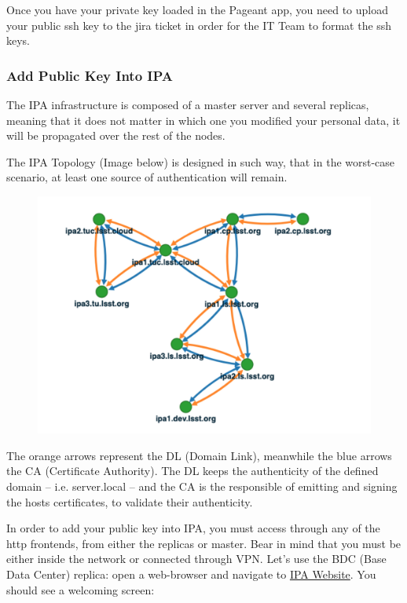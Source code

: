 Once you have your private key loaded in the Pageant app, you need to upload your public ssh key to the jira ticket in order for the IT Team to format the ssh keys.

\newpage

\subsubsection{Add Public Key Into IPA}

The IPA infrastructure is composed of a master server and several replicas, meaning that it does
not matter in which one you modified your personal data, it will be propagated over the rest of the nodes.

\vspace{5 mm}

The IPA Topology (Image below) is designed in such way, that in the worst-case scenario, at least one source
of authentication will remain.

\begin{figure}
  \includegraphics[width=13cm]{Images/example11.png}
\end{figure}

The orange arrows represent the DL (Domain Link), meanwhile the blue arrows the CA (Certificate
Authority). The DL keeps the authenticity of the defined domain – i.e. server.local – and the CA is the
responsible of emitting and signing the hosts certificates, to validate their authenticity.

\vspace{5 mm}
\newpage

In order to add your public key into IPA, you must access through any of the http frontends, from either
the replicas or master. Bear in mind that you must be either inside the network or connected through VPN.
Let’s use the BDC (Base Data Center) replica: open a web-browser and navigate to \href{https://ipa1.cp.lsst.org}{IPA Website}.
You should see a welcoming screen:

